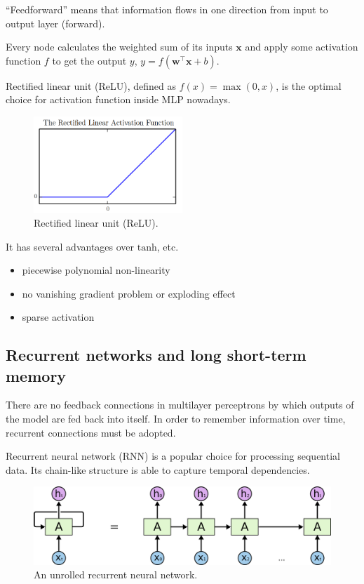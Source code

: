 \documentclass[11pt,a4paper]{report}
\begin{document}
\enquote{Feedforward} means that information flows in one direction from input to output layer (forward).

Every node calculates the weighted sum of its inputs \(\mathbf{x}\) and apply some activation function \(f\) to get the output \(y\), \( y = f (\mathbf{w}^\intercal \mathbf{x} + b) \).

Rectified linear unit (ReLU), defined as \(f(x) = \max(0, x)\), is the optimal choice for activation function inside MLP nowadays.

\begin{figure}[htbp]
  \centering
  \includegraphics[width=0.5\textwidth]{relu.png}
  \caption{Rectified linear unit (ReLU).} \label{fig:relu}
\end{figure}

It has several advantages over \(\mathrm{tanh}\), etc.

\begin{itemize}
  \item piecewise polynomial non-linearity
  \item no vanishing gradient problem or exploding effect
  \item sparse activation
\end{itemize}

\subsection{Recurrent networks and long short-term memory}

There are no feedback connections in multilayer perceptrons by which outputs of the model are fed back into itself.
In order to remember information over time, recurrent connections must be adopted.

Recurrent neural network (RNN) is a popular choice for processing sequential data.
Its chain-like structure is able to capture temporal dependencies.

\begin{figure}[htbp]
  \centering
  \includegraphics[width=\textwidth]{RNN-unrolled.png}
  \caption{An unrolled recurrent neural network.} \label{fig:rnn-intro}
\end{figure}
\end{document}
